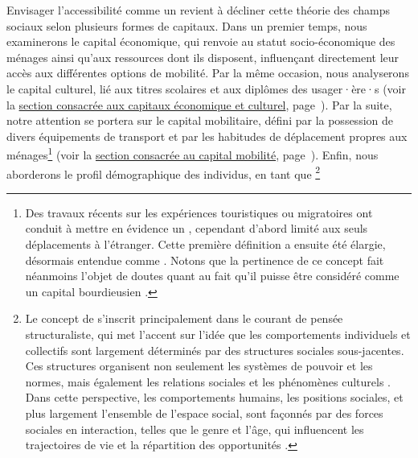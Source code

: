 \begin{refsegment}
Envisager l'accessibilité comme un  revient à décliner cette théorie des champs sociaux selon plusieurs formes de capitaux. Dans un premier temps, nous examinerons le capital économique, qui renvoie au statut socio-économique des ménages ainsi qu'aux ressources dont ils disposent, influençant directement leur accès aux différentes options de mobilité. Par la même occasion, nous analyserons le capital culturel, lié aux titres scolaires et aux diplômes des usager·ère·s (voir la \hyperref[chap4:capital-economique-culturel]{section consacrée aux capitaux économique et culturel}, page~\pageref{chap4:capital-economique-culturel}). Par la suite, notre attention se portera sur le capital mobilitaire, défini par la possession de divers équipements de transport et par les habitudes de déplacement propres aux ménages\footnote{
    Des travaux récents sur les expériences touristiques ou migratoires ont conduit à mettre en évidence un  \textcolor{blue}{\autocite[22]{murphy-lejeune_mobilite_2000}}, cependant d'abord limité aux seuls déplacements à l'étranger. Cette première définition a ensuite été élargie, désormais entendue comme  \textcolor{blue}{\autocite[116]{joxe_capital_2022}}. Notons que la pertinence de ce concept fait néanmoins l'objet de doutes quant au fait qu'il puisse être considéré comme un capital bourdieusien \textcolor{blue}{\autocite{borja_mobilite_2012}}.
} (voir la \hyperref[chap4:capital-mobilite]{section consacrée au capital mobilité}, page~\pageref{chap4:capital-mobilite}). Enfin, nous aborderons le profil démographique des individus, en tant que \footnote{
    Le concept de  s'inscrit principalement dans le courant de pensée structuraliste, qui met l'accent sur l'idée que les comportements individuels et collectifs sont largement déterminés par des structures sociales sous-jacentes. Ces structures organisent non seulement les systèmes de pouvoir et les normes, mais également les relations sociales et les phénomènes culturels \textcolor{blue}{\autocites{saussure_cours_1995}{levi-strauss_anthropologie_1958}}. Dans cette perspective, les comportements humains, les positions sociales, et plus largement l'ensemble de l'espace social, sont façonnés par des forces sociales en interaction, telles que le genre et l'âge, qui influencent les trajectoires de vie et la répartition des opportunités \textcolor{blue}{\autocites{humphrey_gender_1992}{lynch_love_2007}}.
}
\end{refsegment}
